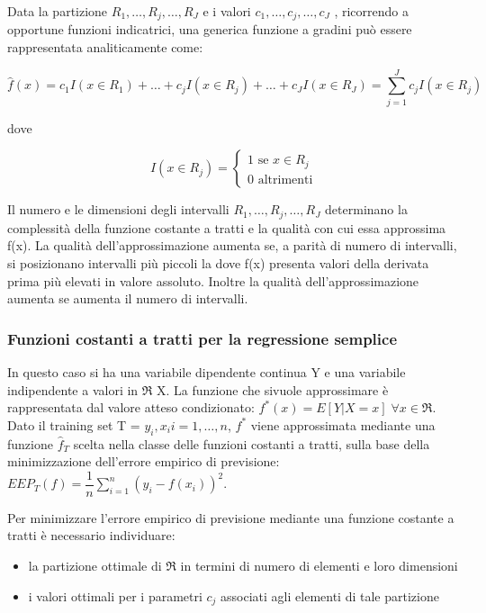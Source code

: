 \documentclass[a4paper]{extarticle}
\begin{document}
Data la partizione ${R_1, \dots, R_j,\dots, R_J}$ e i valori ${c_1,\dots,c_j,\dots,c_J}$ , ricorrendo a opportune funzioni indicatrici, una generica funzione a gradini può essere rappresentata analiticamente come:

\begin{equation*}
\hat f(x) = c_1 I(x \in R_1) + \dots + c_j I(x \in R_j) + \dots + c_J I (x \in R_J) = \sum\limits_{j=1}^J c_j I (x \in R_j) 
\end{equation*}

dove

\begin{equation*}
I(x \in R_j) = 
\begin{cases}
		1 \text{ se } x \in R_j \\
		0 \text{ altrimenti}
	\end{cases}
\end{equation*}

Il numero e le dimensioni degli intervalli ${R_1, \dots, R_j,\dots, R_J}$ determinano la complessità della funzione costante a tratti e la qualità con cui essa approssima f(x). La qualità dell'approssimazione aumenta se, a parità di numero di intervalli, si posizionano intervalli più piccoli la dove f(x) presenta valori della derivata prima più elevati in valore assoluto. Inoltre la qualità dell'approssimazione aumenta se aumenta il numero di intervalli.

\subsubsection{Funzioni costanti a tratti per la regressione semplice}

In questo caso si ha una variabile dipendente continua Y e una variabile indipendente a valori in $\Re$ X. La funzione che sivuole approssimare è rappresentata dal valore atteso condizionato: $f^*(x) = E[Y | X = x] \; \forall x \in \Re$. Dato il training set T = ${y_i,x_i i = 1,\dots, n}$, $f^*$ viene approssimata mediante una funzione $\hat f_T$ scelta nella classe delle funzioni costanti a tratti, sulla base della minimizzazione dell'errore empirico di previsione: $EEP_T(f) = \dfrac{1}{n}\sum\limits_{i=1}^n (y_i - f(x_i))^2$.

Per minimizzare l'errore empirico di previsione mediante una funzione costante a tratti è necessario individuare:

\begin{itemize}
\item la partizione ottimale di $\Re$ in termini di numero di elementi e loro dimensioni
\item i valori ottimali per i parametri $c_j$ associati agli elementi di tale partizione
\end{itemize}
\end{document}
